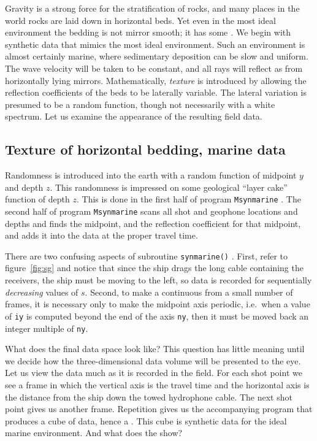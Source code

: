 \par
Gravity is a strong force for the stratification of rocks,
and many places in the world rocks are laid down
in horizontal beds.
Yet even in the most ideal environment the bedding is
not mirror smooth; it has some
{\em {}.}
We begin with synthetic data that mimics the most ideal environment.
Such an environment is almost certainly marine,
where sedimentary deposition can be slow and uniform.
The wave velocity will be taken to be constant,
and all rays will reflect as from horizontally lying mirrors.
Mathematically,
{\em texture}
is introduced by allowing the reflection coefficients
of the beds to be laterally variable.
The lateral variation is presumed to be a random function,
though not necessarily with a white spectrum.
Let us examine the appearance of the resulting field data.

\subsection{Texture of horizontal bedding, marine data}
Randomness is introduced into the earth with
a random function of midpoint  $y$  and depth  $z$.
This randomness is impressed on
some geological ``layer cake'' function of depth $z$.
This is done in the first half of program \texttt{Msynmarine} . %
The second half of program \texttt{Msynmarine} 
scans all shot and geophone locations and depths
and finds the midpoint,
and the reflection coefficient for that midpoint,
and adds it into the data at the proper travel time.

\par
There are two confusing aspects of subroutine \texttt{synmarine()} .
First, refer to figure~\ref{fig:sg} and notice that since the ship
drags the long cable containing the receivers,
the ship must be moving to the left, so data is recorded
for sequentially {\em decreasing} values of $s$.
Second, to make a continuous 
from a small number of frames,
it is necessary only to make the midpoint axis periodic,
i.e.~when a value of {\tt iy} is computed beyond the end of the axis
{\tt ny}, then it must be moved back an integer multiple of {\tt ny}.

\par
What does the final data space look like?
This question has little meaning until we decide how the three-dimensional
data volume will be presented to the eye.
Let us view the data much as it is recorded in the field.
For each shot point we see a frame 
in which the vertical axis is the travel time
and the horizontal axis is the distance from the ship down the towed
hydrophone cable.
The next shot point gives us another frame.
Repetition gives us the accompanying program
that produces a cube of data, hence a .
This cube is synthetic data for the ideal marine environment.
And what does the  show?


